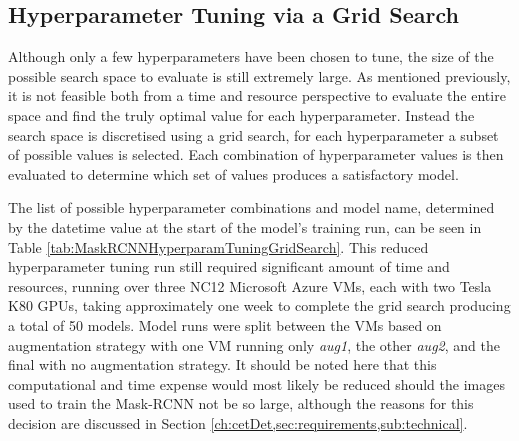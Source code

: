 \subsection{Hyperparameter Tuning via a Grid Search}\label{ch:cetDet,sec:ModelSelection,sub:HyperparameterTuning}

Although only a few hyperparameters have been chosen to tune, the size of the possible search space to evaluate is still extremely large. As mentioned previously, it is not feasible both from a time and resource perspective to evaluate the entire space and find the truly optimal value for each hyperparameter. Instead the search space is discretised using a grid search, for each hyperparameter a subset of possible values is selected. Each combination of hyperparameter values is then evaluated to determine which set of values produces a satisfactory model. 

The list of possible hyperparameter combinations and model name, determined by the datetime value at the start of the model's training run, can be seen in Table \ref{tab:MaskRCNNHyperparamTuningGridSearch}. This reduced hyperparameter tuning run still required significant amount of time and resources, running over three NC12 Microsoft Azure VMs, each with two Tesla K80 GPUs, taking approximately one week to complete the grid search producing a total of 50 models. Model runs were split between the VMs based on augmentation strategy with one VM running only \textit{aug1}, the other \textit{aug2}, and the final with no augmentation strategy. It should be noted here that this computational and time expense would most likely be reduced should the images used to train the Mask-RCNN not be so large, although the reasons for this decision are discussed in Section \ref{ch:cetDet,sec:requirements,sub:technical}.


